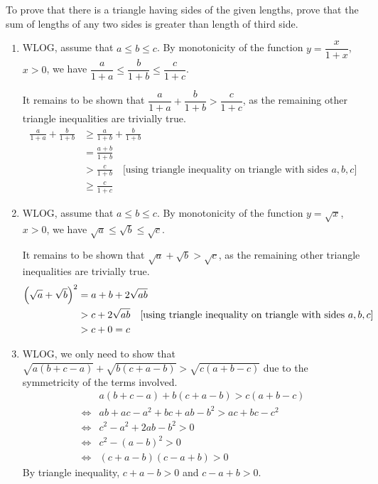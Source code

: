 \begin{solution}
To prove that there is a triangle having sides of the given lengths, prove that the sum of lengths of any two sides is greater than length of third side.
\begin{enumerate}[label=(\alph*)]
\item WLOG, assume that $a\le b\le c$. By monotonicity of the function $y=\dfrac{x}{1+x}$, $x>0$, we have $\dfrac{a}{1+a}\le\dfrac{b}{1+b}\le\dfrac{c}{1+c}$.

It remains to be shown that $\dfrac{a}{1+a}+\dfrac{b}{1+b}>\dfrac{c}{1+c}$, as the remaining other triangle inequalities are trivially true.
\begin{align*}
\frac{a}{1+a}+\frac{b}{1+b} &\ge \frac{a}{1+b}+\frac{b}{1+b} \\
&= \frac{a+b}{1+b} \\
&> \frac{c}{1+b} \quad \text{[using triangle inequality on triangle with sides $a,b,c$]} \\
&\ge \frac{c}{1+c}
\end{align*}

\item WLOG, assume that $a\le b\le c$. By monotonicity of the function $y=\sqrt{x}$, $x>0$, we have $\sqrt{a}\le\sqrt{b}\le\sqrt{c}$.

It remains to be shown that $\sqrt{a}+\sqrt{b}>\sqrt{c}$, as the remaining other triangle inequalities are trivially true.
\begin{align*}
\left(\sqrt{a}+\sqrt{b}\right)^2 &= a+b+2\sqrt{ab} \\
&> c+2\sqrt{ab} \quad \text{[using triangle inequality on triangle with sides $a,b,c$]} \\
&> c+0=c
\end{align*}

\item WLOG, we only need to show that $\sqrt{a(b+c-a)}+\sqrt{b(c+a-b)}>\sqrt{c(a+b-c)}$ due to the symmetricity of the terms involved.
\begin{align*}
&a(b+c-a)+b(c+a-b)>c(a+b-c) \\
\iff &ab+ac-a^2+bc+ab-b^2>ac+bc-c^2 \\
\iff &c^2-a^2+2ab-b^2>0 \\
\iff &c^2-(a-b)^2>0 \\
\iff &(c+a-b)(c-a+b)>0
\end{align*}
By triangle inequality, $c+a-b>0$ and $c-a+b>0$.
\end{enumerate}
\end{solution}
\pagebreak

